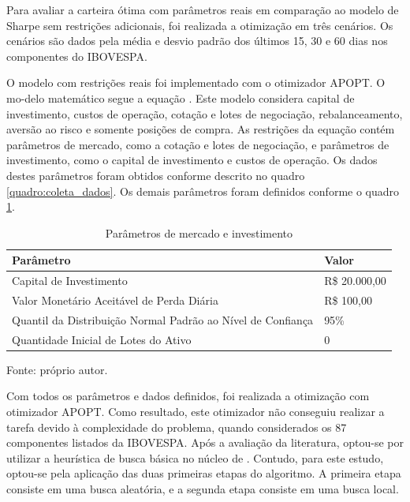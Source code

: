         \ipar Para avaliar a carteira ótima com parâmetros reais em comparação ao modelo de Sharpe sem restrições adicionais, foi realizada a otimização em três cenários. Os cenários são dados pela média e desvio padrão dos últimos 15, 30 e 60 dias nos componentes do \acrshort{IBOVESPA}. 

        \ipar O modelo com restrições reais foi implementado com o otimizador APOPT. O mo-delo matemático segue a equação . Este modelo considera capital de investimento, custos de operação, cotação e lotes de negociação, rebalanceamento, aversão ao risco e somente posições de compra. As restrições da equação contém parâmetros de mercado, como a cotação e lotes de negociação, e parâmetros de investimento, como o capital de investimento e custos de operação. Os dados destes parâmetros foram obtidos conforme descrito no quadro \ref{quadro:coleta_dados}. Os demais parâmetros foram definidos conforme o quadro \ref{quadro:parametros}.

        \begin{table}[H]
            \centering
            \caption{Parâmetros de mercado e investimento}
            \label{quadro:parametros}
            \begin{tabular}{ll}
                \hline
                \textbf{Parâmetro} & \textbf{Valor} \\
                \hline
                Capital de Investimento & R\$ 20.000,00 \\
                Valor Monetário Aceitável de Perda Diária & R\$ 100,00 \\
                Quantil da Distribuição Normal Padrão ao Nível de Confiança & 95\% \\
                Quantidade Inicial de Lotes do Ativo & 0 \\
                \hline
            \end{tabular}
            \par \footnotesize Fonte: próprio autor.
        \end{table}

        \ipar Com todos os parâmetros e dados definidos, foi realizada a otimização com otimizador APOPT. Como resultado, este otimizador não conseguiu realizar a tarefa devido à complexidade do problema, quando considerados os 87 componentes listados da \acrshort{IBOVESPA}. Após a avaliação da literatura, optou-se por utilizar a heurística de busca básica no núcleo de . Contudo, para este estudo, optou-se pela aplicação das duas primeiras etapas do algoritmo. A primeira etapa consiste em uma busca aleatória, e a segunda etapa consiste em uma busca local. 

